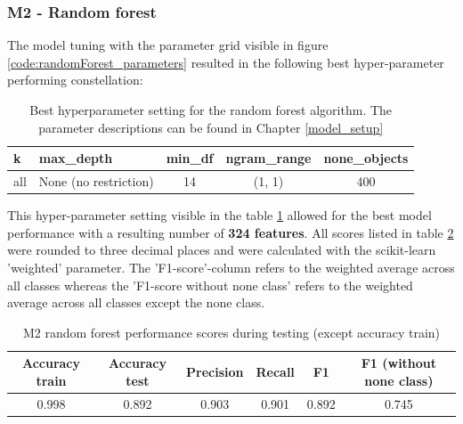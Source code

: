 \subsubsection{M2 - Random forest}
The model tuning with the parameter grid visible in figure \ref{code:randomForest_parameters} resulted in the following best hyper-parameter performing constellation:\\

\begin{table}[h!]
\begin{center}
\caption{Best hyperparameter setting for the random forest algorithm. The parameter descriptions can be found in Chapter \ref{model_setup}}\vspace{1ex}
\label{tab:m2_randomForest_bestParams}
\begin{tabular}{llccc}\hline
k & max\_depth & min\_df & ngram\_range & none\_objects \\ \hline
all & None (no restriction) & 14 & (1, 1) & 400 \\ \hline
\end{tabular}
\end{center}
\end{table}

This hyper-parameter setting visible in the table \ref{tab:m2_randomForest_bestParams} allowed for the best model performance with a resulting number of \textbf{324 features}. All scores listed in table \ref{tab:m2_randomForest_bestscores} were rounded to three decimal places and were calculated with the scikit-learn 'weighted' parameter. The 'F1-score'-column refers to the weighted average across all classes whereas the 'F1-score without none class' refers to the weighted average across all classes except the none class.

\begin{table}[h!]
\begin{center}
\caption{M2 random forest performance scores during testing (except accuracy train)}\vspace{1ex}
\label{tab:m2_randomForest_bestscores}
\begin{tabular}{cccccc}\hline
Accuracy train & Accuracy test & Precision & Recall & F1 & F1 (without none class)\\ \hline
0.998 & 0.892 & 0.903 & 0.901 & 0.892 & 0.745\\ \hline
\end{tabular}
\end{center}
\end{table}

